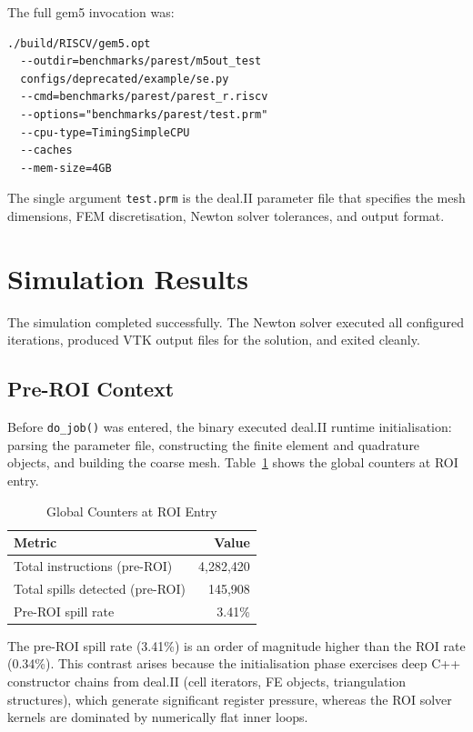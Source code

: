 \documentclass[conference]{IEEEtran}
\begin{document}
The full gem5 invocation was:

\begin{verbatim}
./build/RISCV/gem5.opt
  --outdir=benchmarks/parest/m5out_test
  configs/deprecated/example/se.py
  --cmd=benchmarks/parest/parest_r.riscv
  --options="benchmarks/parest/test.prm"
  --cpu-type=TimingSimpleCPU
  --caches
  --mem-size=4GB
\end{verbatim}

The single argument \texttt{test.prm} is the deal.II parameter file
that specifies the mesh dimensions, FEM discretisation, Newton solver
tolerances, and output format.

\section{Simulation Results}

The simulation completed successfully. The Newton solver executed all
configured iterations, produced VTK output files for the solution,
and exited cleanly.

\subsection{Pre-ROI Context}

Before \texttt{do\_job()} was entered, the binary executed deal.II
runtime initialisation: parsing the parameter file, constructing the
finite element and quadrature objects, and building the coarse mesh.
Table~\ref{tab:preroi} shows the global counters at ROI entry.

\begin{table}[H]
\centering
\caption{Global Counters at ROI Entry}
\label{tab:preroi}
\begin{tabular}{lr}
\toprule
\textbf{Metric} & \textbf{Value} \\
\midrule
Total instructions (pre-ROI) & 4,282,420 \\
Total spills detected (pre-ROI) & 145,908 \\
Pre-ROI spill rate & 3.41\% \\
\bottomrule
\end{tabular}
\end{table}

The pre-ROI spill rate (3.41\%) is an order of magnitude higher than
the ROI rate (0.34\%). This contrast arises because the initialisation
phase exercises deep C++ constructor chains from deal.II (cell
iterators, FE objects, triangulation structures), which generate
significant register pressure, whereas the ROI solver kernels are
dominated by numerically flat inner loops.
\end{document}
